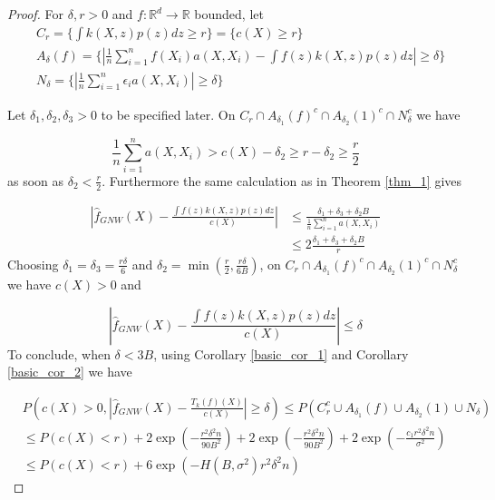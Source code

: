 \documentclass{article}
\begin{document}
\begin{proof}

For $\delta,r>0$ and $f:\mathbb{R}^d\rightarrow \mathbb{R}$ bounded, let 
\begin{equation*}
    \begin{split}
        &C_r=\{\int k(X,z)p(z)dz\geq r\}=\{c(X)\geq r\}\\
        &A_{\delta}(f)=\{|\frac{1}{n}\sum_{i=1}^n f(X_i)a(X,X_i)-\int f(z)k(X,z)p(z)dz|\geq \delta\}\\
        &N_{\delta}=\{|\frac{1}{n}\sum_{i=1}^n \epsilon_ia(X,X_i)|\geq \delta\}
    \end{split}
\end{equation*}

Let $\delta_1,\delta_2,\delta_3>0$ to be specified later.
On $C_r\cap A_{\delta_1}(f)^c\cap A_{\delta_2
}(1)^c\cap N_{\delta}^c$ we have 

\begin{equation*}
    \frac{1}{n}\sum_{i=1}^n a(X,X_i)>c(X)-\delta_2\geq r-\delta_2\geq \frac{r}{2}
\end{equation*}
as soon as $\delta_2<\frac{r}{2}$. Furthermore the same calculation as in Theorem \ref{thm_1}
gives

\begin{equation*}
\begin{split}
     |\hat{f}_{GNW}(X)-\frac{\int f(z)k(X,z)p(z)dz}{c(X)}|&\leq \frac{\delta_1+\delta_3+\delta_2B}{\frac{1}{n}\sum_{i=1}^n a(X,X_i)}\\
     &\leq 2\frac{\delta_1+\delta_3+\delta_2B}{r}
\end{split}
\end{equation*}
Choosing $\delta_1=\delta_3=
\frac{r\delta}{6}$ and $\delta_2=\min(\frac{r}{2},\frac{r\delta}{6B})$, on $C_r\cap A_{\delta_1}(f)^c\cap A_{\delta_2
}(1)^c\cap N_{\delta}^c$ we have $c(X)>0$ and

\begin{equation*}
    |\hat{f}_{GNW}(X)-\frac{\int f(z)k(X,z)p(z)dz}{c(X)}|\leq \delta
\end{equation*}
To conclude, when $\delta<3B$, using Corollary \ref{basic_cor_1} and Corollary \ref{basic_cor_2} we have


\begin{equation*}
\begin{split}
    &P(c(X)>0,|\hat{f}_{GNW}(X)-\frac{T_k(f)(X)}{c(X)}|\geq\delta)\leq P(C_r^c\cup A_{\delta_1}(f)\cup A_{\delta_2
}(1)\cup N_{\delta})\\&\leq P(c(X)<r)+2\exp(-\frac{r^2\delta^2n}{90B^2})+2\exp(-\frac{r^2\delta^2n}{90B^2})+2\exp(-\frac{c_1r^2\delta^2n}{\sigma^2})\\
&\leq P(c(X)<r)+6\exp(-H(B,\sigma^2)r^2\delta^2n)
\end{split}
\end{equation*}

\end{proof}
\end{document}
